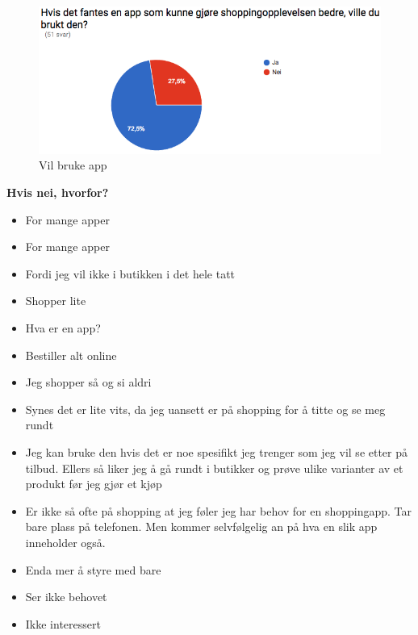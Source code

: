 \begin{figure}[H]
\includegraphics[scale=0.6]{images/sporreundersokelse/brukeapp}
\centering %
\caption{Vil bruke app}
\label{fig:brukeapp}
\end{figure}

\noindent \large{\textbf{Hvis nei, hvorfor?}}
\begin{itemize}
    \item For mange apper
    \item For mange apper
    \item Fordi jeg vil ikke i butikken i det hele tatt
    \item Shopper lite
    \item Hva er en app?
    \item Bestiller alt online
    \item Jeg shopper så og si aldri
    \item Synes det er lite vits, da jeg uansett er på shopping for å titte og se meg rundt
    \item Jeg kan bruke den hvis det er noe spesifikt jeg trenger som jeg vil se etter på tilbud. Ellers så liker jeg å gå rundt i butikker og prøve ulike varianter av et produkt før jeg gjør et kjøp
    \item Er ikke så ofte på shopping at jeg føler jeg har behov for en shoppingapp. Tar bare plass på telefonen. Men kommer selvfølgelig an på hva en slik app inneholder også.
    \item Enda mer å styre med bare
    \item Ser ikke behovet
    \item Ikke interessert
\end{itemize}

